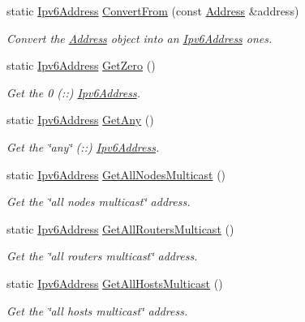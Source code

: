 \begin{DoxyCompactItemize}
static \hyperlink{classns3_1_1Ipv6Address}{Ipv6\+Address} \hyperlink{classns3_1_1Ipv6Address_ac00bc221a0b226b2090d05468aec4b79}{Convert\+From} (const \hyperlink{classns3_1_1Address}{Address} \&address)
\begin{DoxyCompactList}\small\item\em Convert the \hyperlink{classns3_1_1Address}{Address} object into an \hyperlink{classns3_1_1Ipv6Address}{Ipv6\+Address} ones. \end{DoxyCompactList}\item 
static \hyperlink{classns3_1_1Ipv6Address}{Ipv6\+Address} \hyperlink{classns3_1_1Ipv6Address_a63a34bdb1505e05fbdd07d316d0bd7e6}{Get\+Zero} ()
\begin{DoxyCompactList}\small\item\em Get the 0 (\+:\+:) \hyperlink{classns3_1_1Ipv6Address}{Ipv6\+Address}. \end{DoxyCompactList}\item 
static \hyperlink{classns3_1_1Ipv6Address}{Ipv6\+Address} \hyperlink{classns3_1_1Ipv6Address_a2783e8badfc98c8b0a8508bba6e1b91e}{Get\+Any} ()
\begin{DoxyCompactList}\small\item\em Get the \char`\"{}any\char`\"{} (\+:\+:) \hyperlink{classns3_1_1Ipv6Address}{Ipv6\+Address}. \end{DoxyCompactList}\item 
static \hyperlink{classns3_1_1Ipv6Address}{Ipv6\+Address} \hyperlink{classns3_1_1Ipv6Address_a11e6e4228d3d6e814b2c5ffc18c8ed20}{Get\+All\+Nodes\+Multicast} ()
\begin{DoxyCompactList}\small\item\em Get the \char`\"{}all nodes multicast\char`\"{} address. \end{DoxyCompactList}\item 
static \hyperlink{classns3_1_1Ipv6Address}{Ipv6\+Address} \hyperlink{classns3_1_1Ipv6Address_aae006ec0f2c8e0cfd792cc1427f493cf}{Get\+All\+Routers\+Multicast} ()
\begin{DoxyCompactList}\small\item\em Get the \char`\"{}all routers multicast\char`\"{} address. \end{DoxyCompactList}\item 
static \hyperlink{classns3_1_1Ipv6Address}{Ipv6\+Address} \hyperlink{classns3_1_1Ipv6Address_a38d67c0051fd0acea0ab6f85580cd59e}{Get\+All\+Hosts\+Multicast} ()
\begin{DoxyCompactList}\small\item\em Get the \char`\"{}all hosts multicast\char`\"{} address. \end{DoxyCompactList}\item 

\end{DoxyCompactItemize}
